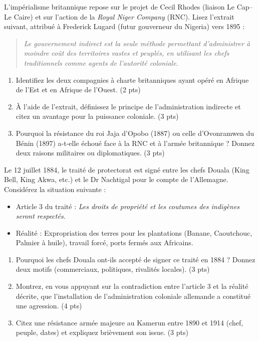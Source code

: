 \documentclass[11pt]{article}
\begin{document}
\begin{exercice}
\noindent L'impérialisme britannique repose sur le projet de Cecil Rhodes (liaison Le Cap--Le Caire) et sur l'action de la \textit{Royal Niger Company} (RNC). Lisez l'extrait suivant, attribué à Frederick Lugard (futur gouverneur du Nigeria) vers 1895 :

\begin{quote}
\og \textit{Le gouvernement indirect est la seule méthode permettant d'administrer à moindre coût des territoires vastes et peuplés, en utilisant les chefs traditionnels comme agents de l'autorité coloniale.} \fg
\end{quote}

\begin{enumerate}
\item Identifiez les deux compagnies à charte britanniques ayant opéré en Afrique de l'Est et en Afrique de l'Ouest. \hfill (2 pts)
\item À l'aide de l'extrait, définissez le principe de l'\og administration indirecte \fg{} et citez un avantage pour la puissance coloniale. \hfill (3 pts)
\item Pourquoi la résistance du roi Jaja d'Opobo (1887) ou celle d'Ovonramwen du Bénin (1897) a-t-elle échoué face à la RNC et à l'armée britannique ? Donnez deux raisons militaires ou diplomatiques. \hfill (3 pts)
\end{enumerate}
\end{exercice}

\begin{exercice}
\noindent Le 12 juillet 1884, le traité de protectorat est signé entre les chefs Douala (King Bell, King Akwa, etc.) et le Dr Nachtigal pour le compte de l'Allemagne. Considérez la situation suivante :

\begin{itemize}
\item Article 3 du traité : \og \textit{Les droits de propriété et les coutumes des indigènes seront respectés.} \fg
\item Réalité : Expropriation des terres pour les plantations (Banane, Caoutchouc, Palmier à huile), travail forcé, ports fermés aux Africains.
\end{itemize}

\begin{enumerate}
\item Pourquoi les chefs Douala ont-ils accepté de signer ce traité en 1884 ? Donnez deux motifs (commerciaux, politiques, rivalités locales). \hfill (3 pts)
\item Montrez, en vous appuyant sur la contradiction entre l'article 3 et la réalité décrite, que l'installation de l'administration coloniale allemande a constitué une agression. \hfill (4 pts)
\item Citez une résistance armée majeure au Kamerun entre 1890 et 1914 (chef, peuple, dates) et expliquez brièvement son issue. \hfill (3 pts)
\end{enumerate}
\end{exercice}
\end{document}
